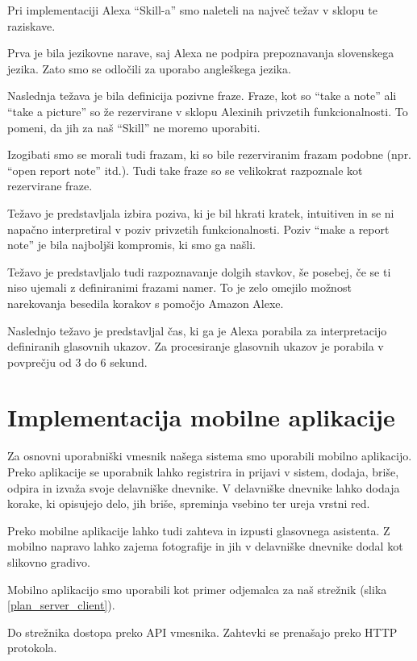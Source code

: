 \documentclass[a4paper, 12pt]{book}
\begin{document}
Pri implementaciji Alexa \enquote{Skill-a} smo naleteli na največ težav v sklopu te raziskave.

Prva je bila jezikovne narave, saj Alexa ne podpira prepoznavanja slovenskega jezika.
Zato smo se odločili za uporabo angleškega jezika.

Naslednja težava je bila definicija pozivne fraze.
Fraze, kot so \enquote{take a note} ali \enquote{take a picture} so že rezervirane v sklopu Alexinih privzetih funkcionalnosti.
To pomeni, da jih za naš \enquote{Skill} ne moremo uporabiti.

Izogibati smo se morali tudi frazam, ki so bile rezerviranim frazam podobne (npr. \enquote{open report note} itd.).
Tudi take fraze so se velikokrat razpoznale kot rezervirane fraze.

Težavo je predstavljala izbira poziva, ki je bil hkrati kratek, intuitiven in se ni napačno interpretiral v poziv privzetih funkcionalnosti.
Poziv \enquote{make a report note} je bila najboljši kompromis, ki smo ga našli.

Težavo je predstavljalo tudi razpoznavanje dolgih stavkov, še posebej, če se ti niso ujemali z definiranimi frazami namer.
To je zelo omejilo možnost narekovanja besedila korakov s pomočjo Amazon Alexe.

Naslednjo težavo je predstavljal čas, ki ga je Alexa porabila za interpretacijo definiranih glasovnih ukazov.
Za procesiranje glasovnih ukazov je porabila v povprečju od 3 do 6 sekund.

\section{Implementacija mobilne aplikacije}


Za osnovni uporabniški vmesnik našega sistema smo uporabili mobilno aplikacijo.
Preko aplikacije se uporabnik lahko registrira in prijavi v sistem, dodaja, briše, odpira in izvaža svoje delavniške dnevnike.
V delavniške dnevnike lahko dodaja korake, ki opisujejo delo, jih briše, spreminja vsebino ter ureja vrstni red.

Preko mobilne aplikacije lahko tudi zahteva in izpusti glasovnega asistenta.
Z mobilno napravo lahko zajema fotografije in jih v delavniške dnevnike dodal kot slikovno gradivo.

Mobilno aplikacijo smo uporabili kot primer odjemalca za naš strežnik (slika \ref{plan_server_client}).

Do strežnika dostopa preko API vmesnika.
Zahtevki se prenašajo preko HTTP protokola.
\end{document}
